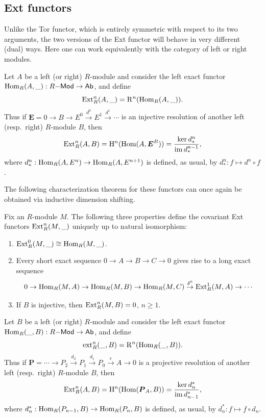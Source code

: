 \subsection{Ext functors}

Unlike the Tor functor, which is entirely symmetric with respect to its two arguments, the two versions of the Ext functor will behave in very different (dual) ways. Here one can work equivalently with the category of left or right modules.

\begin{defn}
    Let $A$ be a left (or right) $R$-module and consider the left exact functor $\operatorname{Hom}_R(A,\_):R\mathsf{-Mod}\to \mathsf{Ab}$, and define
    \[\operatorname{Ext}_R^n(A,\_)=\mathrm{R}^n(\operatorname{Hom}_R(A,\_)).\]
    Thus if $\bm{E}=0\to B\to E^0\overset{d^0}{\to} E^1\overset{d^1}{\to}\cdots$ is an injective resolution of another left (resp.~right) $R$-module $B$, then
    \[\operatorname{Ext}_R^n(A,B)=\mathrm{H}^n(\operatorname{Hom}(A,\boldsymbol{E}^B))=\frac{\ker d_\ast^n}{\operatorname{im} d_\ast^{n-1}},\]
    where $d_\ast^n:\operatorname{Hom}_R(A,E^n)\to \operatorname{Hom}_R(A,E^{n+1})$ is defined, as usual, by $d_\ast^n:f\mapsto d^n\circ f$.
\end{defn}

The following characterization theorem for these functors can once again be obtained via inductive dimension shifting.

\begin{thm}
    Fix an $R$-module $M$. The following three properties define the covariant Ext functors $\operatorname{Ext}_R^n(M,\_)$ uniquely up to natural isomorphism:
    \begin{enumerate}
        \item $\operatorname{Ext}^0_R(M,\_)\cong\operatorname{Hom}_R(M,\_)$.
        \item Every short exact sequence $0\to A\to B\to C\to 0$ gives rise to a long exact sequence
        \[0\to \operatorname{Hom}_R(M,A)\to \operatorname{Hom}_R(M,B)\to \operatorname{Hom}_R(M,C)\overset{\delta^0}{\to} \operatorname{Ext}^1_R(M,A)\to\cdots \]
        \item If $B$ is injective, then $\operatorname{Ext}_R^n(M,B)=0$, $n\geq 1$.
    \end{enumerate}
\end{thm}


\begin{defn}
    Let $B$ be a left (or right) $R$-module and consider the left exact functor $\operatorname{Hom}_R(\_,B):R\mathsf{-Mod}\to \mathsf{Ab}$, and define
    \[\operatorname{ext}_R^n(\_,B)=\mathrm{R}^n(\operatorname{Hom}_R(\_,B)).\]
    Thus if $\bm{P}=\cdots\to P_2\overset{d_2}\to P_1\overset{d_1}{\to} P_0 \overset{\epsilon}{\to}A\to 0$ is a projective resolution of another left (resp.~right) $R$-module $B$, then
    \[\operatorname{Ext}_R^n(A,B)=\mathrm{H}^n(\operatorname{Hom}(\boldsymbol{P}_A,B))=\frac{\ker d_n^{\ast}}{\operatorname{im} d_{n-1}^\ast},\]
    where $d_n^{\ast}:\operatorname{Hom}_R(P_{n-1},B)\to \operatorname{Hom}_R(P_n,B)$ is defined, as usual, by $d_n^{\ast}:f\mapsto f\circ d_n$.
\end{defn}


